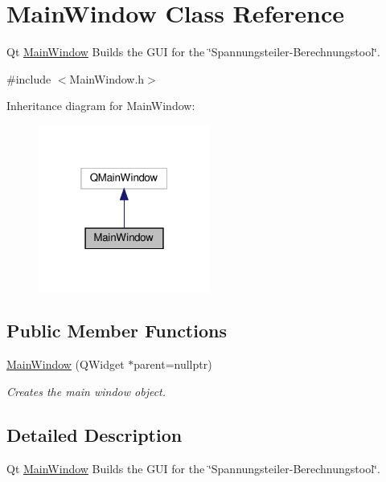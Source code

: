 \hypertarget{classMainWindow}{}\section{Main\+Window Class Reference}
\label{classMainWindow}


Qt \hyperlink{classMainWindow}{Main\+Window} Builds the G\+UI for the \char`\"{}\+Spannungsteiler-\/\+Berechnungstool\char`\"{}.  




{\ttfamily \#include $<$Main\+Window.\+h$>$}



Inheritance diagram for Main\+Window\+:
\nopagebreak
\begin{figure}[H]
\begin{center}
\leavevmode
\includegraphics[width=160pt]{classMainWindow__inherit__graph}
\end{center}
\end{figure}
\subsection*{Public Member Functions}
\begin{DoxyCompactItemize}
\item 
\hyperlink{classMainWindow_a996c5a2b6f77944776856f08ec30858d}{Main\+Window} (Q\+Widget $\ast$parent=nullptr)
\begin{DoxyCompactList}\small\item\em Creates the main window object. \end{DoxyCompactList}\end{DoxyCompactItemize}


\subsection{Detailed Description}
Qt \hyperlink{classMainWindow}{Main\+Window} Builds the G\+UI for the \char`\"{}\+Spannungsteiler-\/\+Berechnungstool\char`\"{}. 

